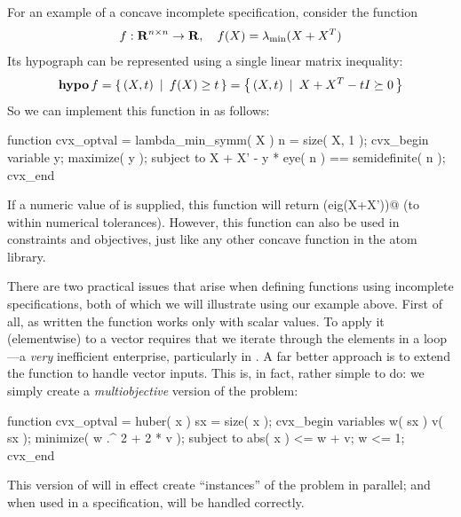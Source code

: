\documentclass[12pt]{article}
\begin{document}
For an example of a concave incomplete specification, consider the function
\begin{equation}
	f:\R^{n\times n}\rightarrow\R, \quad f(X) = \lambda_{\min}(X+X^T)
\end{equation}
Its hypograph can be represented using a single linear matrix inequality:
\begin{equation}
	\operatorname{\textbf{hypo}} f = \left\{\, (X,t) \,~|~\, f(X) \geq t \,\right\} = \left\{\, (X,t) \,~|~\, X + X^T - t I \succeq 0 \,\right\}
\end{equation}
So we can implement this function in \cvx as follows:
\begin{code}
	function cvx_optval = lambda_min_symm( X )
	n = size( X, 1 );
	cvx_begin
	    variable y;
	    maximize( y );
	    subject to
	        X + X' - y * eye( n ) == semidefinite( n );
	cvx_end
\end{code}
If a numeric value of \verb@X@ is supplied, this function will return
\verb@min(eig(X+X'))@ (to within numerical tolerances). However, this function
can also be used in \cvx constraints and objectives, just like any other concave
function in the atom library.

There are two practical issues that arise when defining functions
using incomplete specifications, both of which we will illustrate using
our \verb@huber@ example above. First of all, as written the function works
only with scalar values. To apply it (elementwise) 
to a vector requires that we iterate
through the elements in a \verb@for@ loop---a \emph{very} 
inefficient enterprise,
particularly in \cvx. A far better 
approach is to extend the \verb@huber@ function to handle vector inputs. This
is, in fact, rather simple to do: we simply create a \emph{multiobjective}
version of the problem:
\begin{code}
	function cvx_optval = huber( x )
	sx = size( x );
	cvx_begin
	    variables w( sx ) v( sx );
	    minimize( w .^ 2 + 2 * v );
	    subject to
	        abs( x ) <= w + v;
	        w <= 1;
	cvx_end
\end{code}
This version of \verb@huber@ will in effect create \verb@sx@ ``instances''
of the problem in parallel; and when used in a \cvx specification,
will be handled correctly.
\end{document}
